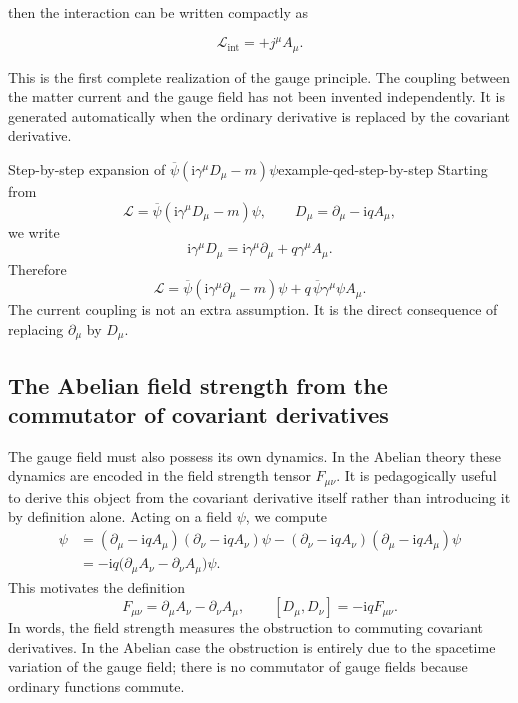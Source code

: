 \documentclass[11pt,a4paper]{article}
\newcommand{\Lag}{\mathcal{L}}
\newcommand{\ii}{\mathrm{i}}
\newcommand{\p}{\partial}
\newcommand{\gmu}{\gamma^\mu}
\newcommand{\psibar}{\overline{\psi}}
\begin{document}
then the interaction can be written compactly as

\begin{equation}
\Lag_{\text{int}}= + j^\mu A_\mu.
\label{eq:qed-current-coupling-expanded}
\end{equation}


This is the first complete realization of the gauge principle. The coupling between the matter current and the gauge field has not been invented independently. It is generated automatically when the ordinary derivative is replaced by the covariant derivative.


\begin{examplebox}{Step-by-step expansion of \texorpdfstring{$\psibar(\ii\gamma^\mu D_\mu-m)\psi$}{psi-bar(i gamma D - m) psi}}{example-qed-step-by-step}
Starting from
\[
\Lag=\psibar(\ii\gmu D_\mu-m)\psi,
\qquad D_\mu=\p_\mu-\ii qA_\mu,
\]
we write
\[
\ii\gmu D_\mu=\ii\gmu\p_\mu + q\gmu A_\mu.
\]
Therefore
\[
\Lag = \psibar(\ii\gmu\p_\mu-m)\psi + q\,\psibar\gmu\psi A_\mu.
\]
The current coupling is not an extra assumption. It is the direct consequence of replacing \(\p_\mu\) by \(D_\mu\).
\end{examplebox}



\subsection{The Abelian field strength from the commutator of covariant derivatives}

The gauge field must also possess its own dynamics. In the Abelian theory these dynamics are encoded in the field strength tensor \(F_{\mu\nu}\). It is pedagogically useful to derive this object from the covariant derivative itself rather than introducing it by definition alone. Acting on a field \(\psi\), we compute
\begin{align}
[D_\mu,D_\nu]\psi
&=
(\p_\mu-\ii qA_\mu)(\p_\nu-\ii qA_\nu)\psi
-(\p_\nu-\ii qA_\nu)(\p_\mu-\ii qA_\mu)\psi
\nonumber\\
&=
-\ii q\bigl(\p_\mu A_\nu-\p_\nu A_\mu\bigr)\psi.
\end{align}
This motivates the definition
\begin{equation}
F_{\mu\nu}=\p_\mu A_\nu-\p_\nu A_\mu,
\qquad
[D_\mu,D_\nu]=-\ii qF_{\mu\nu}.
\label{eq:abelian-field-strength-expanded}
\end{equation}
In words, the field strength measures the obstruction to commuting covariant derivatives. In the Abelian case the obstruction is entirely due to the spacetime variation of the gauge field; there is no commutator of gauge fields because ordinary functions commute.
\end{document}
